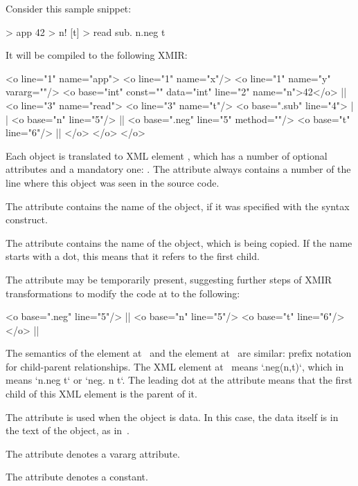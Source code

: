 Consider this sample \eo{} snippet:

\begin{ffcode}
[x y...] > app
  42 > n!
  [t] > read
    sub.
      n.neg
      t
\end{ffcode}

It will be compiled to the following XMIR:

\begin{ffcode}
<o line="1" name="app">
  <o line="1" name="x"/>
  <o line="1" name="y" vararg=""/>
  <o base="int" const="" data="int"
    line="2" name="n">42</o>   |$\label{ln:xml-data}$|
  <o line="3" name="read">
    <o line="3" name="t"/>
    <o base=".sub" line="4"> |$\label{ln:xml-sub}$|
      <o base="n" line="5"/> |$\label{ln:method-start}$|
      <o base=".neg" line="5" method=""/>
      <o base="t" line="6"/> |$\label{ln:method-end}$|
    </o>
  </o>
</o>
\end{ffcode}

Each object is translated to XML element , which has
a number of optional attributes and a mandatory one: .
The attribute  always contains a number of the
line where this object was seen in the source code.

The attribute  contains the name of the object, if
it was specified with the \ff{>} syntax construct.

The attribute  contains the name of the object, which
is being copied. If the name starts with a dot, this means
that it refers to the first  child.

The attribute  may be temporarily present, suggesting
further steps of XMIR transformations to modify the code
at  to the following:

\begin{ffcode}
<o base=".neg" line="5"/> |$\label{ln:xml-neg}$|
  <o base="n" line="5"/>
  <o base="t" line="6"/>
</o>  |$\label{ln:xml-neg-end}$|
\end{ffcode}

The semantics of the element  at~
and the element  at~ are similar: prefix
notation for child-parent relationships. The XML element at~
means `.neg(n,t)`, which in~\eo{} means `n.neg t` or `neg. n t`. The
leading dot at the attribute  means that the first
child of this XML element is the \eo{} parent of it.

The attribute  is used when the object is data. In this
case, the data itself is in the text of the object, as in~.

The attribute  denotes a vararg attribute.

The attribute  denotes a constant.
